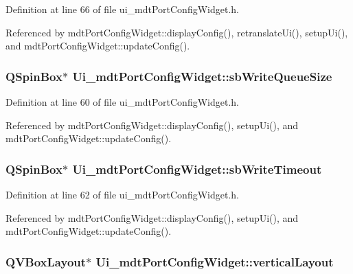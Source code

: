 Definition at line 66 of file ui\-\_\-mdt\-Port\-Config\-Widget.\-h.



Referenced by mdt\-Port\-Config\-Widget\-::display\-Config(), retranslate\-Ui(), setup\-Ui(), and mdt\-Port\-Config\-Widget\-::update\-Config().

\hypertarget{class_ui__mdt_port_config_widget_ab5ded09564d59f57338a99642c8ad739}{
\subsubsection[{sb\-Write\-Queue\-Size}]{\setlength{\rightskip}{0pt plus 5cm}Q\-Spin\-Box$\ast$ Ui\-\_\-mdt\-Port\-Config\-Widget\-::sb\-Write\-Queue\-Size}}\label{class_ui__mdt_port_config_widget_ab5ded09564d59f57338a99642c8ad739}


Definition at line 60 of file ui\-\_\-mdt\-Port\-Config\-Widget.\-h.



Referenced by mdt\-Port\-Config\-Widget\-::display\-Config(), setup\-Ui(), and mdt\-Port\-Config\-Widget\-::update\-Config().

\hypertarget{class_ui__mdt_port_config_widget_a146b41c99efbf3042b3eda59b18d3fe8}{
\subsubsection[{sb\-Write\-Timeout}]{\setlength{\rightskip}{0pt plus 5cm}Q\-Spin\-Box$\ast$ Ui\-\_\-mdt\-Port\-Config\-Widget\-::sb\-Write\-Timeout}}\label{class_ui__mdt_port_config_widget_a146b41c99efbf3042b3eda59b18d3fe8}


Definition at line 62 of file ui\-\_\-mdt\-Port\-Config\-Widget.\-h.



Referenced by mdt\-Port\-Config\-Widget\-::display\-Config(), setup\-Ui(), and mdt\-Port\-Config\-Widget\-::update\-Config().

\hypertarget{class_ui__mdt_port_config_widget_aea81d581baa2c160bf8ff37ec74a63fc}{
\subsubsection[{vertical\-Layout}]{\setlength{\rightskip}{0pt plus 5cm}Q\-V\-Box\-Layout$\ast$ Ui\-\_\-mdt\-Port\-Config\-Widget\-::vertical\-Layout}}\label{class_ui__mdt_port_config_widget_aea81d581baa2c160bf8ff37ec74a63fc}


